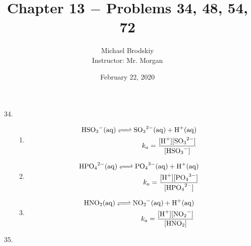\documentclass[12pt]{article}
\title{Chapter 13 $-$ Problems 34, 48, 54, 72}
\date{February 22, 2020}
\author{Michael Brodskiy\\ \small Instructor: Mr. Morgan}
\begin{document}
\maketitle

\begin{enumerate}

    \setcounter{enumi}{33}

  \item

    \begin{enumerate}

      \item 
        
        \begin{equation}
          \begin{split}
            \ce{HSO3-(aq) <=> SO3^2-(aq) + H+(aq)}\\
            k_a=\frac{[\ce{H+}][\ce{SO3^2-}]}{[\ce{HSO3-}]}
          \end{split}
          \label{1}
        \end{equation}

      \item

        \begin{equation}
          \begin{split}
            \ce{HPO4^2-(aq) <=> PO4^3-(aq) + H+(aq)}\\
            k_a=\frac{[\ce{H+}][\ce{PO4^3-}]}{[\ce{HPO4^2-}]}
          \end{split}
          \label{2}
        \end{equation}

      \item

        \begin{equation}
          \begin{split}
            \ce{HNO2(aq) <=> NO2-(aq) + H+(aq)}\\
            k_a=\frac{[\ce{H+}][\ce{NO2-}]}{[\ce{HNO2}]}
          \end{split}
          \label{3}
        \end{equation}

    \end{enumerate}

    \setcounter{enumi}{47}

  \item


\end{enumerate}
\end{document}
